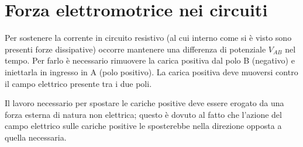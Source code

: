 \section{Forza elettromotrice nei circuiti}

Per sostenere la corrente in circuito resistivo (al cui interno come si \`e visto sono presenti forze dissipative)  occorre mantenere una differenza di potenziale $V_{AB}$
 nel tempo. Per farlo \`e necessario rimuovere la carica positiva dal polo B (negativo) e iniettarla in ingresso in A (polo positivo). La carica positiva deve muoversi contro il campo elettrico presente tra i due poli. 
 
 Il lavoro necessario per spostare le cariche positive deve essere erogato da una forza esterna di natura non elettrica; questo \`e dovuto al fatto che l'azione del campo elettrico sulle cariche positive le sposterebbe nella direzione opposta a quella necessaria. 
 

